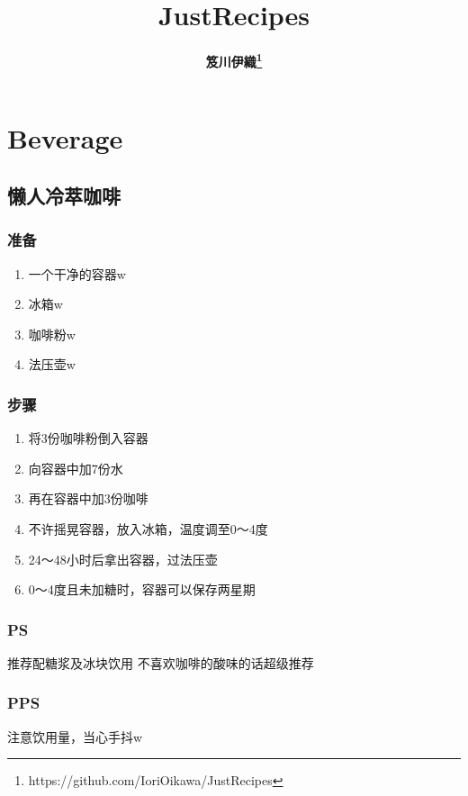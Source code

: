 \documentclass[12pt, a4paper]{ctexart}
\begin{document}
\title{JustRecipes}
\author{\bfseries 笈川伊織\footnote{https://github.com/IoriOikawa/JustRecipes}}
\date{}

\maketitle
\setcounter{secnumdepth}{2}
\tableofcontents

\newpage
\section{Beverage}

\subsection{懒人冷萃咖啡}
\subsubsection{准备}
\begin{enumerate}
    \item{一个干净的容器w}
    \item{冰箱w}
    \item{咖啡粉w}
    \item{法压壶w}
\end{enumerate}

\subsubsection{步骤}
\begin{enumerate}
    \item{将3份咖啡粉倒入容器}
    \item{向容器中加7份水}
    \item{再在容器中加3份咖啡}
    \item{不许摇晃容器，放入冰箱，温度调至0～4度}
    \item{24～48小时后拿出容器，过法压壶}
    \item{0～4度且未加糖时，容器可以保存两星期}
\end{enumerate}

\subsubsection{PS}
推荐配糖浆及冰块饮用 不喜欢咖啡的酸味的话超级推荐

\subsubsection{PPS}
注意饮用量，当心手抖w
\end{document}
